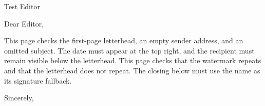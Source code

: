 \documentclass[12pt]{QHUletter}
\date{October 28, 2026}
\begin{document}
\begin{letter}{Test Editor}
\opening{Dear Editor,}
This page checks the first-page letterhead, an empty sender address,
and an omitted subject. The date must appear at the top right, and the
recipient must remain visible below the letterhead.
\newpage
This page checks that the watermark repeats and that the letterhead does
not repeat. The closing below must use the name as its signature fallback.
\closing{Sincerely,}
\end{letter}
\end{document}
